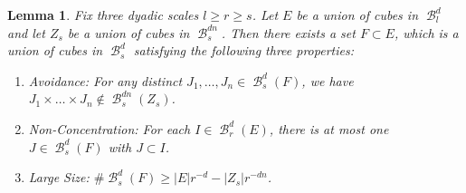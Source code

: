 \documentclass[dvipsnames,letterpaper,12pt]{article}
\numberwithin{equation}{section}
\theoremstyle{plain}
\newtheorem{lemma}{Lemma}
\DeclareMathOperator{\B}{\mathcal{B}}
\begin{document}
\begin{lemma} \label{discretelemma}
	Fix three dyadic scales $l \geq r \geq s$. Let $E$ be a union of cubes in $\B_l^d$ and let $Z_s$ be a union of cubes in $\B_s^{dn}$. Then there exists a set $F \subset E$, which is a union of cubes in $\B_s^d$ satisfying the following three properties:
	\begin{enumerate}
		\item\label{avoidanceItem} \emph{Avoidance}: For any distinct $J_1, \dots, J_n \in \B^d_s(F)$, we have $J_1 \times \dots \times J_n \not \in \B_s^{dn}(Z_s)$.
		\item\label{nonConcentrationItem} \emph{Non-Concentration}: For each $I \in \B_r^d(E)$, there is at most one $J \in \B_s^d(F)$ with $J \subset I$.
		\item\label{largeSizeItem} \emph{Large Size}: $\# \B_s^d(F) \geq |E| r^{-d}- |Z_s|r^{-dn}$.
	\end{enumerate}
\end{lemma}
\end{document}
